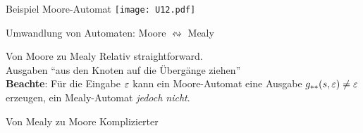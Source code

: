 \begin{frame}{Beispiel Moore-Automat}
	\texttt{[image: U12.pdf]}	
\end{frame}


\begin{frame}{Umwandlung von Automaten: Moore $\leftrightsquigarrow$ Mealy}
	\begin{block}{Von Moore zu Mealy}
		Relativ straightforward.\\
		Ausgaben \enquote{aus den Knoten auf die Übergänge ziehen}\\
		\medskip
		\textbf{Beachte}: Für die Eingabe $\varepsilon$ kann ein Moore-Automat eine Ausgabe $g_{**}(s, \varepsilon) \neq \varepsilon$ erzeugen, ein Mealy-Automat \emph{jedoch nicht}.
	\end{block}

	\begin{block}{Von Mealy zu Moore}
		Komplizierter
	\end{block}
\end{frame}

